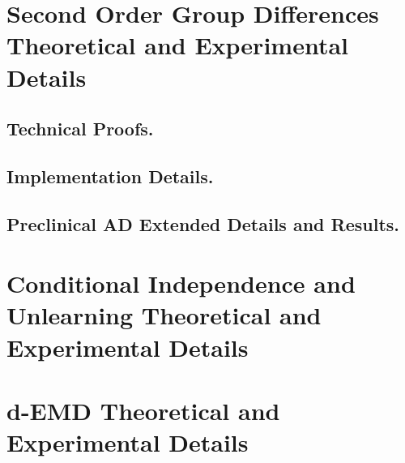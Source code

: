 
\chapter{Second Order Group Differences Theoretical and Experimental Details}
\section{Technical Proofs.}

\section{Implementation Details.}


\section{Preclinical AD Extended Details and Results.}



%
\chapter{Conditional Independence and Unlearning Theoretical and Experimental Details}





\chapter{d-EMD Theoretical and Experimental Details}









